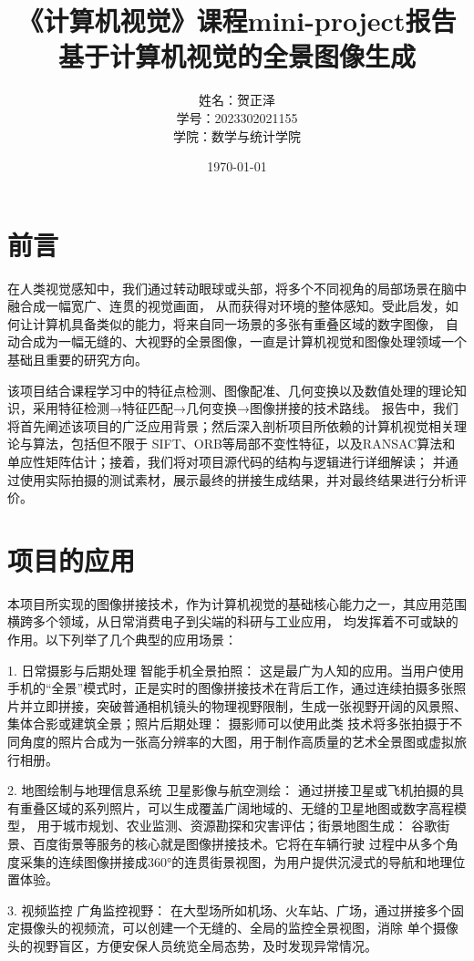 \documentclass[12pt,a4paper]{article}     %
\title{《计算机视觉》课程mini-project报告\\[0.5cm] %
       \large  基于计算机视觉的全景图像生成\\ %
       }
\author{姓名：贺正泽\\学号：2023302021155\\学院：数学与统计学院}
\date{\today}   %
\begin{document}

\maketitle   %

\tableofcontents
\newpage

\section{前言}
在人类视觉感知中，我们通过转动眼球或头部，将多个不同视角的局部场景在脑中融合成一幅宽广、连贯的视觉画面，
从而获得对环境的整体感知。受此启发，如何让计算机具备类似的能力，将来自同一场景的多张有重叠区域的数字图像，
自动合成为一幅无缝的、大视野的全景图像，一直是计算机视觉和图像处理领域一个基础且重要的研究方向。

该项目结合课程学习中的特征点检测、图像配准、几何变换以及数值处理的理论知识，采用特征检测→特征匹配→几何变换→图像拼接的技术路线。
报告中，我们将首先阐述该项目的广泛应用背景；然后深入剖析项目所依赖的计算机视觉相关理论与算法，包括但不限于
SIFT、ORB等局部不变性特征，以及RANSAC算法和单应性矩阵估计；接着，我们将对项目源代码的结构与逻辑进行详细解读；
并通过使用实际拍摄的测试素材，展示最终的拼接生成结果，并对最终结果进行分析评价。
\section{项目的应用}
本项目所实现的图像拼接技术，作为计算机视觉的基础核心能力之一，其应用范围横跨多个领域，从日常消费电子到尖端的科研与工业应用，
均发挥着不可或缺的作用。以下列举了几个典型的应用场景：

1. 日常摄影与后期处理   
智能手机全景拍照： 这是最广为人知的应用。当用户使用手机的“全景”模式时，正是实时的图像拼接技术在背后工作，通过连续拍摄多张照
片并立即拼接，突破普通相机镜头的物理视野限制，生成一张视野开阔的风景照、集体合影或建筑全景；照片后期处理： 摄影师可以使用此类
技术将多张拍摄于不同角度的照片合成为一张高分辨率的大图，用于制作高质量的艺术全景图或虚拟旅行相册。

2. 地图绘制与地理信息系统  
卫星影像与航空测绘： 通过拼接卫星或飞机拍摄的具有重叠区域的系列照片，可以生成覆盖广阔地域的、无缝的卫星地图或数字高程模型，
用于城市规划、农业监测、资源勘探和灾害评估；街景地图生成： 谷歌街景、百度街景等服务的核心就是图像拼接技术。它将在车辆行驶
过程中从多个角度采集的连续图像拼接成360°的连贯街景视图，为用户提供沉浸式的导航和地理位置体验。

3. 视频监控
广角监控视野： 在大型场所如机场、火车站、广场，通过拼接多个固定摄像头的视频流，可以创建一个无缝的、全局的监控全景视图，消除
单个摄像头的视野盲区，方便安保人员统览全局态势，及时发现异常情况。
\end{document}
